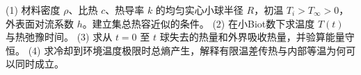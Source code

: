 (1) 材料密度 \(\rho\)、比热 \(c\)、热导率 \(k\) 的均匀实心小球半径 \(R\)，初温 \(T_i>T_\infty>0\)，外表面对流系数 \(h\)。建立集总热容近似的条件。
(2) 在小Biot数下求温度 \(T(t)\) 与热弛豫时间。
(3) 求从 \(t=0\) 至 \(t\) 球失去的热量和外界吸收热量，并验算能量守恒。
(4) 求冷却到环境温度极限时总熵产生，解释有限温差传热与内部等温为何可以同时成立。
